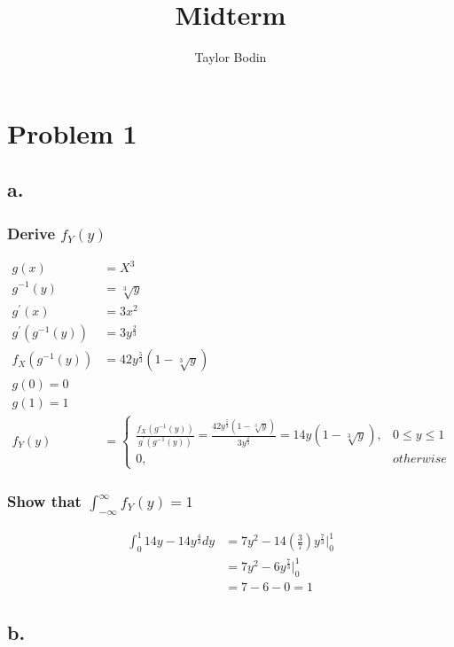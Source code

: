 \documentclass[12pt]{article}
\begin{document}
\title{Midterm}
\author{Taylor Bodin}
\maketitle

\section*{Problem 1}

\subsection*{a.}

\subsubsection*{Derive $f_Y(y)$ }
\begin{align*}
  g(x) &= X^3 \\
  g^{-1}(y) &= \sqrt[3]{y} \\
  g^{'}(x) &= 3x^2 \\
  g^{'}(g^{-1}(y)) &= 3y^{\frac{2}{3}} \\
  f_X(g^{-1}(y)) &= 42y^{\frac{5}{3}}(1-\sqrt[3]{y}) \\
  g(0) = 0 \\
  g(1) = 1 \\
  f_Y(y) &= 
  \begin{cases}
    \frac{f_X(g^{-1}(y))}{g^{'}(g^{-1}(y))} 
    = \frac{42y^{\frac{5}{3}}(1-\sqrt[3]{y})}{3y^{\frac{2}{3}}}
    = 14y(1-\sqrt[3]{y}), & 0 \leq y \leq 1 \\
    0, & otherwise
  \end{cases}
\end{align*}

\subsubsection*{Show that $\int_{-\infty}^\infty f_Y(y) = 1$}
\begin{align*}
  \int_0^1 14y-14y^\frac{4}{3}dy 
  &= 7y^2 - 14\left(\frac{3}{7}\right)y^{\frac{7}{3}}\big|_0^1 \\
  &= 7y^2 - 6y^{\frac{7}{3}}\big|_0^1 \\
  &= 7 - 6 - 0 = 1
\end{align*}

\subsection*{b.}
\end{document}
